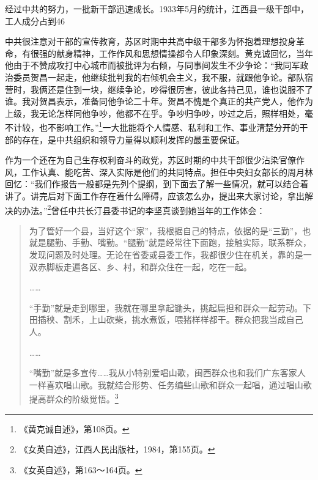 经过中共的努力，一批新干部迅速成长。1933年5月的统计，江西县一级干部中，工人成分占到46%


中共很注意对干部的宣传教育，苏区时期中共高中级干部多为怀抱着理想投身革命，有很强的献身精神，工作作风和思想情操都令人印象深刻。黄克诚回忆，当年他由于不赞成攻打中心城市而被批评为右倾，与同事间发生不少争论：“我同军政治委员贺昌一起走，他继续批判我的右倾机会主义，我不服，就跟他争论。部队宿营时，我俩还是住到一块，继续争论，吵得很厉害，彼此各持己见，谁也说服不了谁。我对贺昌表示，准备同他争论二十年。贺昌不愧是个真正的共产党人，他作为上级，我无论怎样同他争吵，他都不在乎。争吵归争吵，吵过之后，照样相处，毫不计较，也不影响工作。”\footnote{《黄克诚自述》，第108页。}一大批能将个人情感、私利和工作、事业清楚分开的干部的存在，是中共组织和领导力量得以顺利发挥的最重要保证。


作为一个还在为自己生存权利奋斗的政党，苏区时期的中共干部很少沾染官僚作风，工作认真、能吃苦、深入实际是他们的共同特点。担任中央妇女部长的周月林回忆：“我们作报告一般都是先列个提纲，到下面去了解一些情况，就可以结合着讲了。讲完后对下面工作存在着什么障碍，应该怎么办，提出来大家讨论，拿出解决的办法。”\footnote{《女英自述》，江西人民出版社，1984，第155页。}曾任中共长汀县委书记的李坚真谈到她当年的工作体会：

\begin{quote}

为了管好一个县，当好这个“家”，我根据自己的特点，依据的是“三勤”，也就是腿勤、手勤、嘴勤。“腿勤”就是经常往下面跑，接触实际，联系群众，发现问题及时处理。无论在省委或县委工作，我都很少住在机关，靠的是一双赤脚板走遍各区、乡、村，和群众住在一起，吃在一起。

……

“手勤”就是走到哪里，我就在哪里拿起锄头，挑起扁担和群众一起劳动。下田插秧、割禾，上山砍柴，挑水煮饭，喂猪样样都干。群众把我当成自己人。

……

“嘴勤”就是多宣传……我从小特别爱唱山歌，闽西群众也和我们广东客家人一样喜欢唱山歌。我就结合形势、任务编些山歌和群众一起唱，通过唱山歌提高群众的阶级觉悟。\footnote{《女英自述》，第163～164页。}
\end{quote}


